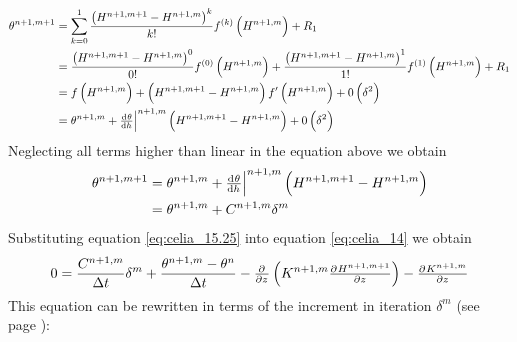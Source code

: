 \begin{align*}
  \theta^{n+1,m+1} &= \sum_{k=0}^1\frac{\del{ H^{n+1,m+1} - H^{n+1,m} }^k}{k!}f^{\del{ k }}\del{ H^{n+1,m} } + R_1 \\
                   &= \frac{\del{ H^{n+1,m+1} - H^{n+1,m} }^0}{0!} f^{\del{ 0 }}\del{ H^{n+1,m} } + \frac{\del{ H^{n+1,m+1} - H^{n+1,m} }^1}{1!} f^{\del{ 1 }}\del{ H^{n+1,m} } + R_1 \\
                   &= f\del{ H^{n+1,m} } + \del{ H^{n+1,m+1} - H^{n+1,m} } f'\del{ H^{n+1,m} } + 0 \del{ \delta^2 } \\
  \label{eq:celia_15}
                   &= \theta^{n+1,m} + \evalat{\od{\theta}{h}}{n+1,m} \del{ H^{n+1,m+1} - H^{n+1,m} } + 0 \del{ \delta^2 }
\end{align*}
Neglecting all terms higher than linear in the equation above we obtain
\begin{align}
  \theta^{n+1,m+1} &= \theta^{n+1,m} + \evalat{\od{\theta}{h}}{n+1,m} \del{ H^{n+1,m+1} - H^{n+1,m} } \\
  \label{eq:celia_15.25}
                   &= \theta^{n+1,m} + C^{n+1,m} \delta^m
\end{align}
Substituting equation \eqref{eq:celia_15.25} into equation \eqref{eq:celia_14} we obtain
\begin{equation*}
  0 = \frac{C^{n+1,m}}{\Delta t} \delta^m + \frac{\theta^{n+1,m}  - \theta^n}{\Delta t} - \pd{}{z} \del{ K^{n+1,m}\pd{H^{n+1,m+1}}{z} } - \pd{K^{n+1,m}}{z}
\end{equation*}
This equation can be rewritten in terms of the increment in iteration $\delta ^m$ (see page \pageref{celia_15.5_transformation}):
\newpage
\label{celia_15.5_transformation}
